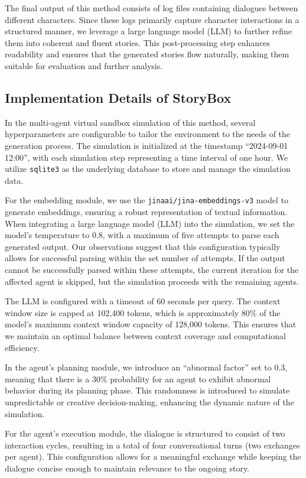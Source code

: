 \documentclass[letterpaper]{article} %
\begin{document}
The final output of this method consists of log files containing dialogues between different characters. Since these logs primarily capture character interactions in a structured manner, we leverage a large language model (LLM) to further refine them into coherent and fluent stories. This post-processing step enhances readability and ensures that the generated stories flow naturally, making them suitable for evaluation and further analysis.


\subsection{Implementation Details of StoryBox}

In the multi-agent virtual sandbox simulation of this method, several hyperparameters are configurable to tailor the environment to the needs of the generation process. The simulation is initialized at the timestamp ``2024-09-01 12:00'', with each simulation step representing a time interval of one hour. We utilize \texttt{sqlite3} as the underlying database to store and manage the simulation data.

For the embedding module, we use the \texttt{jinaai/jina-embeddings-v3} model to generate embeddings, ensuring a robust representation of textual information. When integrating a large language model (LLM) into the simulation, we set the model's temperature to 0.8, with a maximum of five attempts to parse each generated output. Our observations suggest that this configuration typically allows for successful parsing within the set number of attempts. If the output cannot be successfully parsed within these attempts, the current iteration for the affected agent is skipped, but the simulation proceeds with the remaining agents.

The LLM is configured with a timeout of 60 seconds per query. The context window size is capped at 102,400 tokens, which is approximately 80\% of the model's maximum context window capacity of 128,000 tokens. This ensures that we maintain an optimal balance between context coverage and computational efficiency.

In the agent's planning module, we introduce an ``abnormal factor'' set to 0.3, meaning that there is a 30\% probability for an agent to exhibit abnormal behavior during its planning phase. This randomness is introduced to simulate unpredictable or creative decision-making, enhancing the dynamic nature of the simulation.

For the agent's execution module, the dialogue is structured to consist of two interaction cycles, resulting in a total of four conversational turns (two exchanges per agent). This configuration allows for a meaningful exchange while keeping the dialogue concise enough to maintain relevance to the ongoing story.
\end{document}
